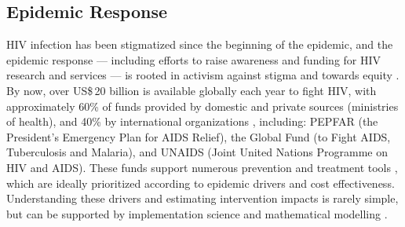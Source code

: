 \subsection{Epidemic Response}\label{intro.hiv.resp}
HIV infection has been stigmatized since the beginning of the epidemic, and the epidemic response
--- including efforts to raise awareness and funding for HIV research and services ---
is rooted in activism against stigma and towards equity \cite{Merson2008}.
By now, over US\$\,20 billion is available globally each year to fight HIV, with approximately
60\% of funds provided by domestic and private sources (\eg ministries of health), and
40\% by international organizations \cite{UNAIDSFin}, including:
PEPFAR (the President's Emergency Plan for AIDS Relief),
the Global Fund (to Fight AIDS, Tuberculosis and Malaria), and
UNAIDS (Joint United Nations Programme on HIV and AIDS).
These funds support numerous prevention and treatment tools \cite{Eisinger2019tk},
which are ideally prioritized according to epidemic drivers and cost effectiveness.
Understanding these drivers and estimating intervention impacts is rarely simple,
but can be supported by implementation science and mathematical modelling
\cite{Shelton2010,Mutevedzi2014,Geffen2018,Baral2019,Schwartz2022}.
